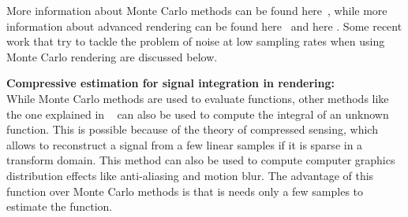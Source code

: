 More information about Monte Carlo methods can be found here~\cite{kalos2009monte}, 
while more information about advanced rendering can be found here~\cite{dutré2006advanced} and here \cite{pharr2010physically}.
Some recent work that try to tackle the problem of noise at low sampling rates when using Monte Carlo rendering are discussed below.

\textbf{Compressive estimation for signal integration in rendering:} \\ 
While Monte Carlo methods are used to evaluate functions, 
other methods like the one explained in ~\cite{Sen:CompressiveSignalEstimation:2010} can also be used to compute the integral of an unknown function.
This is possible because of the theory of compressed sensing, which allows to reconstruct a signal from a few linear samples if it is sparse in a transform domain.
This method can also be used to compute computer graphics distribution effects like anti-aliasing and motion blur.
The advantage of this function over Monte Carlo methods is that is needs only a few samples to estimate the function.
\\

